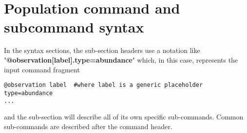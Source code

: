 \section{Population command and subcommand syntax\label{sec:population-syntax}}

In the syntax sections, the sub-section headers use a notation like "\textbf {@observation[label].type=abundance}" which, in this case, represents the input command fragment
{\small{\begin{verbatim}
@observation label  #where label is a generic placeholder
type=abundance
...
\end{verbatim}}}
and the sub-section will describe all of its own specific sub-commands. Common sub-commands are described after the command header.

\subsection{}


\subsection{}


\subsection{}


\subsection{}


\subsection{}


\subsection{}


\subsection{}


